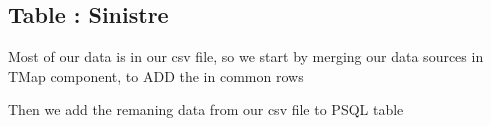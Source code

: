 \subsection{Table : Sinistre}
Most of our data is in our csv file, so we start by merging our data sources in TMap component, to ADD the in common rows
\begin{figure}[H]
\centering
{}
\end{figure}
\begin{figure}[H]
\centering
{}
\end{figure}
\begin{figure}[H]
\centering
{}
\end{figure}

Then we add the remaning data from our csv file to PSQL table
\begin{figure}[H]
\centering
{}
\end{figure}

